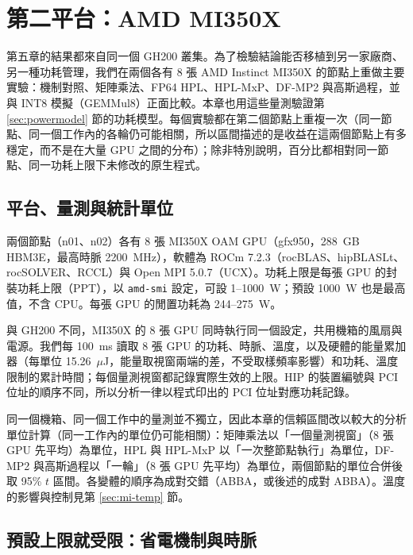 \chapter{第二平台：AMD MI350X}\label{ch:mi350}

第五章的結果都來自同一個 GH200 叢集。為了檢驗結論能否移植到另一家廠商、另一種功耗管理，我們在兩個各有 8 張 AMD Instinct MI350X 的節點上重做主要實驗：機制對照、矩陣乘法、FP64 HPL、HPL-MxP、DF-MP2 與高斯過程，並與 INT8 模擬（GEMMul8）正面比較。本章也用這些量測驗證第 \ref{sec:powermodel} 節的功耗模型。每個實驗都在第二個節點上重複一次（同一節點、同一個工作內的各輪仍可能相關，所以區間描述的是收益在這兩個節點上有多穩定，而不是在大量 GPU 之間的分布）；除非特別說明，百分比都相對同一節點、同一功耗上限下未修改的原生程式。

\section{平台、量測與統計單位}\label{sec:mi-setup}

兩個節點（n01、n02）各有 8 張 MI350X OAM GPU（gfx950，288~GB HBM3E，最高時脈 2200~MHz），軟體為 ROCm 7.2.3（rocBLAS、hipBLASLt、rocSOLVER、RCCL）與 Open MPI 5.0.7（UCX）。功耗上限是每張 GPU 的封裝功耗上限（PPT），以 \texttt{amd-smi} 設定，可設 1–1000~W；預設 1000~W 也是最高值，不含 CPU。每張 GPU 的閒置功耗為 244–275~W。

與 GH200 不同，MI350X 的 8 張 GPU 同時執行同一個設定，共用機箱的風扇與電源。我們每 100~ms 讀取 8 張 GPU 的功耗、時脈、溫度，以及硬體的能量累加器（每單位 15.26~$\mu$J，能量取視窗兩端的差，不受取樣頻率影響）和功耗、溫度限制的累計時間；每個量測視窗都記錄實際生效的上限。HIP 的裝置編號與 PCI 位址的順序不同，所以分析一律以程式印出的 PCI 位址對應功耗記錄。

同一個機箱、同一個工作中的量測並不獨立，因此本章的信賴區間改以較大的分析單位計算（同一工作內的單位仍可能相關）：矩陣乘法以「一個量測視窗」（8 張 GPU 先平均）為單位，HPL 與 HPL-MxP 以「一次整節點執行」為單位，DF-MP2 與高斯過程以「一輪」（8 張 GPU 先平均）為單位，兩個節點的單位合併後取 95\% $t$ 區間。各變體的順序為成對交錯（ABBA，或後述的成對 ABBA）。溫度的影響與控制見第 \ref{sec:mi-temp} 節。

\section{預設上限就受限：省電機制與時脈}\label{sec:mi-mech}


